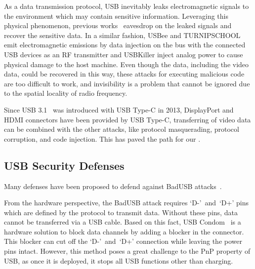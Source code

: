 As a data transmission protocol, \ac{USB} inevitably leaks electromagnetic signals
to the environment which may contain sensitive information. Leveraging this
physical phenomenon, previous works~\cite{smartphone,
poweremi,revealing,su2017usb,usbgpslocator,bates2014leveraging,badusbhub,usbfinger,side,usbdriver}
eavesdrop on the leaked signals and recover the sensitive data. In a similar fashion, USBee\cite{usbee} and TURNIPSCHOOL\cite{turnip} emit electromagnetic emissions by data injection on the bus
with the connected \ac{USB} devices as an RF transmitter and USBKiller\cite{usbkiller}
inject analog
power to cause physical damage to the host machine. Even though the data,
including the video data, could be recovered in this way, these attacks for
executing malicious code are too difficult to work, and invisibility is a
problem that cannot be ignored due to the spatial locality of radio frequency.

Since \ac{USB} 3.1~\cite{usb31} was introduced with \ac{USB} Type-C in 2013, DisplayPort and HDMI
connectors have been provided by \ac{USB} Type-C, transferring of video data can be
combined with the other attacks, like protocol masquerading,  protocol
corruption, and code injection. This has paved the path for our \tool.

\subsection{USB Security Defenses}
\label{subsec:usb_defence}

Many defenses have been proposed to defend against BadUSB attacks~\cite{sok}.

From the hardware perspective, the BadUSB attack requires \mbox{`D-' and `D+'} pins which
are defined by the protocol to transmit data. Without these pins, data cannot 
be transferred via a \ac{USB} cable. Based
on this fact, \ac{USB} Condom~\cite{Condom} is a hardware solution to block data
channels by adding a blocker in the connector. This blocker can cut off the \mbox{`D-' and `D+'} connection while leaving the power pins intact. However, this method poses
a great challenge to the \ac{PnP} property of \ac{USB}, as once it is deployed, it
stops all \ac{USB} functions other than charging.

